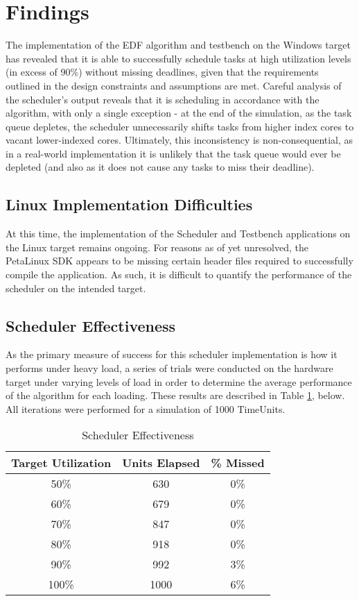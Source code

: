 
\section{Findings}\label{sec:findings}
The implementation of the EDF algorithm and testbench on the Windows target has revealed that it is able to successfully schedule tasks at high utilization levels (in excess of 90\%) without missing deadlines, given that the requirements outlined in the design constraints and assumptions are met. Careful analysis of the scheduler's output reveals that it is scheduling in accordance with the algorithm, with only a single exception - at the end of the simulation, as the task queue depletes, the scheduler unnecessarily shifts tasks from higher index cores to vacant lower-indexed cores. Ultimately, this inconsistency is non-consequential, as in a real-world implementation it is unlikely that the task queue would ever be depleted (and also as it does not cause any tasks to miss their deadline).

\subsection{Linux Implementation Difficulties}\label{linuxImplDifficulties}
At this time, the implementation of the Scheduler and Testbench applications on the Linux target remains ongoing. For reasons as of yet unresolved, the PetaLinux SDK appears to be missing certain header files required to successfully compile the application. As such, it is difficult to quantify the performance of the scheduler on the intended target.

\subsection{Scheduler Effectiveness}\label{schedulerData}
As the primary measure of success for this scheduler implementation is how it performs under heavy load, a series of trials were conducted on the hardware target under varying levels of load in order to determine the average performance of the algorithm for each loading. These results are described in Table \ref{table:1}, below. All iterations were performed for a simulation of 1000 TimeUnits.

\begin{table}[h!]
    \centering\begin{tabular}{| c | c | c |}
        \hline
        Target Utilization & Units Elapsed & \% Missed \\
        \hline
        50\% & 630 & 0\% \\
        60\% & 679 & 0\% \\
        70\% & 847 & 0\% \\
        80\% & 918 & 0\% \\
        90\% & 992 & 3\% \\
        100\% & 1000 & 6\% \\
        \hline
    \end{tabular}
    \caption{Scheduler Effectiveness}
    \label{table:1}
\end{table}


